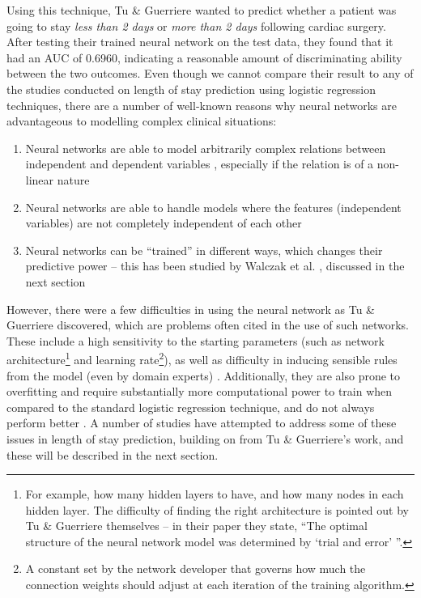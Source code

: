 Using this technique,
Tu \& Guerriere wanted to predict whether a patient was going to stay
\textit{less than 2 days} or \textit{more than 2 days} following cardiac
surgery. After testing their trained neural network on the test data, they
found that it had an AUC of 0.6960, indicating a reasonable amount of
discriminating ability between the two outcomes. Even though we cannot compare
their result to any of the studies conducted on length of stay prediction
using logistic regression techniques, there are a number of well-known reasons
why neural networks are advantageous to modelling complex clinical situations:
\begin{enumerate}
\item Neural networks are able to model arbitrarily complex relations between
independent and dependent variables \citep{Buchman1994,Tu1996}, especially if
the relation is of a non-linear nature
\item Neural networks are able to handle models where the features (independent
variables) are not completely independent of each other \cite{Tu1996}
\item Neural networks can be ``trained'' in different ways, which changes their
predictive power -- this has been studied by Walczak et al. \citep{Walczak2003},
discussed in the next section
\end{enumerate}

However, there were a few difficulties in using the neural network as Tu \&
Guerriere discovered, which are problems often cited in the use of such
networks. These include a high sensitivity to the starting parameters (such as
network architecture\footnote{For example, how many hidden layers to have, and
how many nodes in each hidden layer. The difficulty of finding the right
architecture is pointed out by Tu \& Guerriere themselves -- in their paper
they state, ``The optimal structure of the neural network model was determined
by `trial and error' ''.}
and learning rate\footnote{A constant set by the
network developer that governs how much the connection weights should adjust at
each iteration of the training algorithm.}), as well as difficulty in
inducing sensible rules from the model (even by domain
experts) \citep{Bellazzi2008}. Additionally, they are also prone to overfitting
and require substantially more computational power to train when compared to
the standard logistic regression technique, and do not always perform
better \citep{Harper2005}. A number of studies have attempted to address some of
these issues in length of stay prediction, building on from Tu \& Guerriere's
work, and these will be described in the next section.

